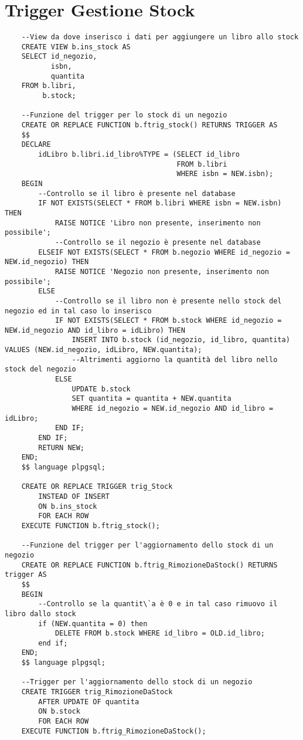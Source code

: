 \section{Trigger Gestione Stock}
\begin{lstlisting}
    --View da dove inserisco i dati per aggiungere un libro allo stock
    CREATE VIEW b.ins_stock AS
    SELECT id_negozio,
           isbn,
           quantita
    FROM b.libri,
         b.stock;
    
    --Funzione del trigger per lo stock di un negozio
    CREATE OR REPLACE FUNCTION b.ftrig_stock() RETURNS TRIGGER AS
    $$
    DECLARE
        idLibro b.libri.id_libro%TYPE = (SELECT id_libro
                                         FROM b.libri
                                         WHERE isbn = NEW.isbn);
    BEGIN
        --Controllo se il libro è presente nel database
        IF NOT EXISTS(SELECT * FROM b.libri WHERE isbn = NEW.isbn) THEN
            RAISE NOTICE 'Libro non presente, inserimento non possibile';
            --Controllo se il negozio è presente nel database
        ELSEIF NOT EXISTS(SELECT * FROM b.negozio WHERE id_negozio = NEW.id_negozio) THEN
            RAISE NOTICE 'Negozio non presente, inserimento non possibile';
        ELSE
            --Controllo se il libro non è presente nello stock del negozio ed in tal caso lo inserisco
            IF NOT EXISTS(SELECT * FROM b.stock WHERE id_negozio = NEW.id_negozio AND id_libro = idLibro) THEN
                INSERT INTO b.stock (id_negozio, id_libro, quantita) VALUES (NEW.id_negozio, idLibro, NEW.quantita);
                --Altrimenti aggiorno la quantità del libro nello stock del negozio
            ELSE
                UPDATE b.stock
                SET quantita = quantita + NEW.quantita
                WHERE id_negozio = NEW.id_negozio AND id_libro = idLibro;
            END IF;
        END IF;
        RETURN NEW;
    END;
    $$ language plpgsql;
    
    CREATE OR REPLACE TRIGGER trig_Stock
        INSTEAD OF INSERT
        ON b.ins_stock
        FOR EACH ROW
    EXECUTE FUNCTION b.ftrig_stock();
    
    --Funzione del trigger per l'aggiornamento dello stock di un negozio
    CREATE OR REPLACE FUNCTION b.ftrig_RimozioneDaStock() RETURNS trigger AS
    $$
    BEGIN
        --Controllo se la quantit\`a è 0 e in tal caso rimuovo il libro dallo stock
        if (NEW.quantita = 0) then
            DELETE FROM b.stock WHERE id_libro = OLD.id_libro;
        end if;
    END;
    $$ language plpgsql;
    
    --Trigger per l'aggiornamento dello stock di un negozio
    CREATE TRIGGER trig_RimozioneDaStock
        AFTER UPDATE OF quantita
        ON b.stock
        FOR EACH ROW
    EXECUTE FUNCTION b.ftrig_RimozioneDaStock();
\end{lstlisting}
